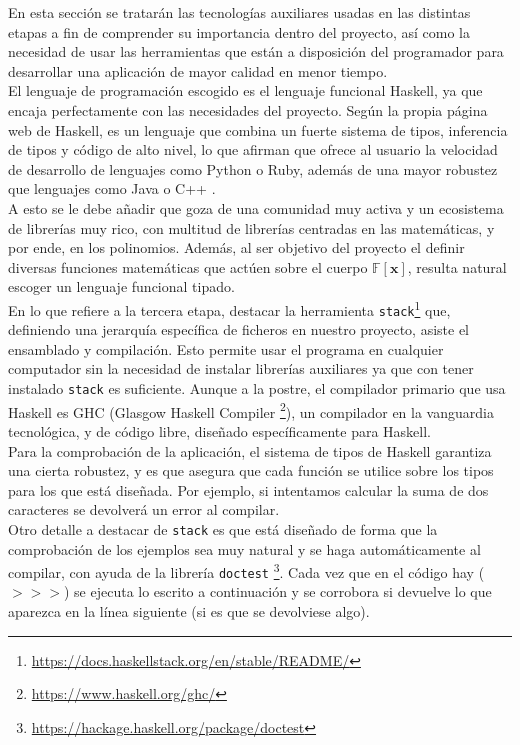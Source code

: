 En esta sección se tratarán las tecnologías auxiliares usadas en las distintas etapas a fin de comprender su importancia dentro del proyecto, así como la necesidad de usar las herramientas que están a disposición del programador para desarrollar una aplicación de mayor calidad en menor tiempo.\\

El lenguaje de programación escogido es el lenguaje funcional Haskell, ya que encaja perfectamente con las necesidades del proyecto. Según la propia página web de Haskell, es un lenguaje que combina un fuerte sistema de tipos, inferencia de tipos y código de alto nivel, lo que afirman que ofrece al usuario la velocidad de desarrollo de lenguajes como Python o Ruby, además de una mayor robustez que lenguajes como Java o C++ .\\

A esto se le debe añadir que goza de una comunidad muy activa y un ecosistema de librerías muy rico, con multitud de librerías centradas en las matemáticas, y por ende, en los polinomios. Además, al ser objetivo del proyecto el definir diversas funciones matemáticas que actúen sobre el cuerpo $\mathbb{F} [\textbf{x}]$, resulta natural escoger un lenguaje funcional tipado.\\

En lo que refiere a la tercera etapa, destacar la herramienta \texttt{stack}\footnote{\url{https://docs.haskellstack.org/en/stable/README/}} que, definiendo una jerarquía específica de ficheros en nuestro proyecto, asiste el ensamblado y compilación. Esto permite usar el programa en cualquier computador sin la necesidad de instalar librerías auxiliares ya que con tener instalado \texttt{stack} es suficiente. Aunque a la postre, el compilador primario que usa Haskell es GHC (Glasgow Haskell Compiler \footnote{\url{https://www.haskell.org/ghc/}}), un compilador en la vanguardia tecnológica, y de código libre, diseñado específicamente para Haskell.\\

Para la comprobación de la aplicación, el sistema de tipos de Haskell garantiza una cierta robustez, y es que asegura que cada función se utilice sobre los tipos para los que está diseñada. Por ejemplo, si intentamos calcular la suma de dos caracteres se devolverá un error al compilar.\\

Otro detalle a destacar de \texttt{stack} es que está diseñado de forma que la comprobación de los ejemplos sea muy natural y se haga automáticamente al compilar, con ayuda de la librería \texttt{doctest} \footnote{\url{https://hackage.haskell.org/package/doctest}}. Cada vez que en el código hay ($>>>$) se ejecuta lo escrito a continuación y se corrobora si devuelve lo que aparezca en la línea siguiente (si es que se devolviese algo). 

